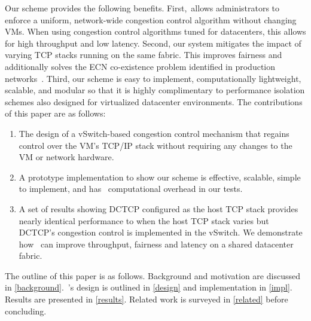 Our scheme provides the following benefits. First,~\acdc allows
administrators to enforce a uniform, network-wide congestion control algorithm without changing VMs. When using congestion control algorithms tuned for 
datacenters, this allows for high throughput and low latency. Second,
our system mitigates the impact of varying TCP stacks running on the same fabric. This improves fairness and additionally
solves the ECN co-existence problem identified in production networks~\cite{wu2012tuning,judd2015nsdi}. 
Third, our scheme is easy to implement, computationally lightweight, scalable, and modular so that it is highly complimentary to
performance isolation schemes also designed for virtualized datacenter environments.
The contributions of this paper are as follows:
\begin{enumerate}
\item The design of a vSwitch-based congestion control mechanism that regains control over the VM's TCP/IP stack
without requiring any changes to the VM or network hardware. 
\item A prototype implementation to show our scheme is effective, scalable, simple to implement, and has~ computational overhead in our tests.
\item A set of results showing DCTCP configured as the host TCP stack provides nearly identical
performance to when the host TCP stack varies but DCTCP's congestion control is implemented in the vSwitch. We demonstrate how~\acdc{} can improve
throughput, fairness and latency on a shared datacenter fabric.
\end{enumerate}

The outline of this paper is as follows. Background and motivation are discussed in \cref{background}.~\acdc{}'s design is outlined in \cref{design} and
implementation in \cref{impl}. Results are presented in \cref{results}. Related work is surveyed in \cref{related}
before concluding.


